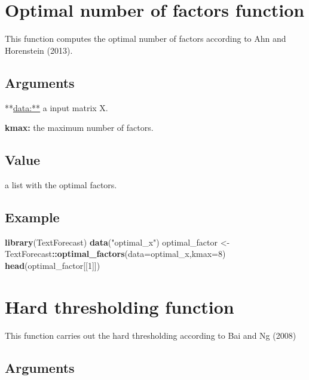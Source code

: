 \documentclass[]{article}
\newenvironment{Shaded}{\begin{snugshade}}{\end{snugshade}}
\newcommand{\KeywordTok}[1]{\textcolor[rgb]{0.13,0.29,0.53}{\textbf{#1}}}
\newcommand{\DataTypeTok}[1]{\textcolor[rgb]{0.13,0.29,0.53}{#1}}
\newcommand{\DecValTok}[1]{\textcolor[rgb]{0.00,0.00,0.81}{#1}}
\newcommand{\StringTok}[1]{\textcolor[rgb]{0.31,0.60,0.02}{#1}}
\newcommand{\OperatorTok}[1]{\textcolor[rgb]{0.81,0.36,0.00}{\textbf{#1}}}
\newcommand{\NormalTok}[1]{#1}
\begin{document}
\section{Optimal number of factors
function}\label{optimal-number-of-factors-function}

This function computes the optimal number of factors according to Ahn
and Horenstein (2013).

\subsection{Arguments}\label{arguments-6}

**\url{data:**} a input matrix X.

\textbf{kmax:} the maximum number of factors.

\subsection{Value}\label{value-6}

a list with the optimal factors.

\subsection{Example}\label{example-6}

\begin{Shaded}
\begin{Highlighting}[]
\KeywordTok{library}\NormalTok{(TextForecast)}
\KeywordTok{data}\NormalTok{(}\StringTok{"optimal_x"}\NormalTok{)}
\NormalTok{optimal_factor <-}\StringTok{ }\NormalTok{TextForecast}\OperatorTok{::}\KeywordTok{optimal_factors}\NormalTok{(}\DataTypeTok{data=}\NormalTok{optimal_x,}\DataTypeTok{kmax=}\DecValTok{8}\NormalTok{)}
\KeywordTok{head}\NormalTok{(optimal_factor[[}\DecValTok{1}\NormalTok{]])}
\end{Highlighting}
\end{Shaded}

\section{Hard thresholding function}\label{hard-thresholding-function}

This function carries out the hard thresholding according to Bai and Ng
(2008)

\subsection{Arguments}\label{arguments-7}
\end{document}
